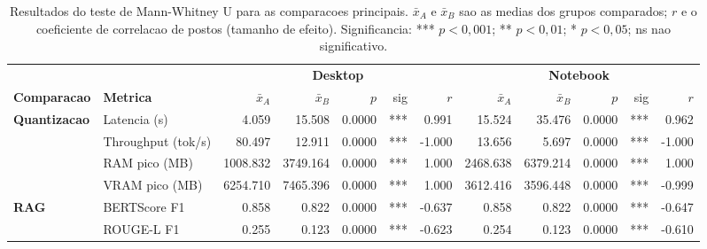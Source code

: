 \begin{table}[ht]
\centering
\small
\caption{Resultados do teste de Mann-Whitney U para as comparacoes principais.
$\bar{x}_A$ e $\bar{x}_B$ sao as medias dos grupos comparados;
$r$ e o coeficiente de correlacao de postos (tamanho de efeito).
Significancia: *** $p{<}0{,}001$; ** $p{<}0{,}01$; * $p{<}0{,}05$; ns nao significativo.}
\label{tab:hypothesis}
\begin{tabular}{llrrrrrrrrrr}
\toprule
& & \multicolumn{5}{c}{\textbf{Desktop}} & \multicolumn{5}{c}{\textbf{Notebook}} \\
\cmidrule(lr){3-7}\cmidrule(lr){8-12}
\textbf{Comparacao} & \textbf{Metrica}
  & $\bar{x}_A$ & $\bar{x}_B$ & $p$ & sig & $r$
  & $\bar{x}_A$ & $\bar{x}_B$ & $p$ & sig & $r$ \\
\midrule
  \textbf{Quantizacao} & Latencia (s) & 4.059 & 15.508 & 0.0000 & *** & 0.991 & 15.524 & 35.476 & 0.0000 & *** & 0.962 \\
   & Throughput (tok/s) & 80.497 & 12.911 & 0.0000 & *** & -1.000 & 13.656 & 5.697 & 0.0000 & *** & -1.000 \\
   & RAM pico (MB) & 1008.832 & 3749.164 & 0.0000 & *** & 1.000 & 2468.638 & 6379.214 & 0.0000 & *** & 1.000 \\
   & VRAM pico (MB) & 6254.710 & 7465.396 & 0.0000 & *** & 1.000 & 3612.416 & 3596.448 & 0.0000 & *** & -0.999 \\
  \midrule
  \textbf{RAG} & BERTScore F1 & 0.858 & 0.822 & 0.0000 & *** & -0.637 & 0.858 & 0.822 & 0.0000 & *** & -0.647 \\
   & ROUGE-L F1 & 0.255 & 0.123 & 0.0000 & *** & -0.623 & 0.254 & 0.123 & 0.0000 & *** & -0.610 \\
\bottomrule
\end{tabular}
\end{table}
